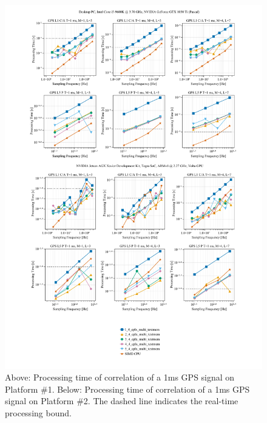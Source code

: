 \documentclass{juliacon}
\begin{document}
\begin{figure}[t]
    \centerline{\includegraphics[scale = .8]{allplots.pdf}}
    \caption{Above: Processing time of correlation of a 1ms GPS signal on Platform \#1. Below: Processing time of correlation of a 1ms GPS signal on Platform \#2. The dashed line indicates the real-time processing bound.\label{fig:allplots}}
 \end{figure}
 
\end{document}
